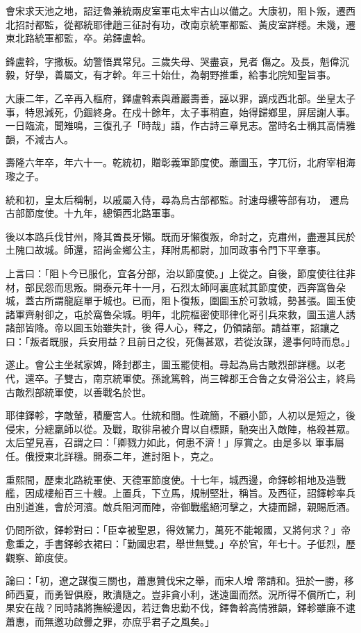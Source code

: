 \begin{pinyinscope}
 會宋求天池之地，詔迂魯兼統兩皮室軍屯太牢古山以備之。大康初，阻卜叛，遷西北招討都監，從都統耶律趙三征討有功，改南京統軍都監、黃皮室詳穩。未幾，遷東北路統軍都監，卒。弟鐸盧斡。



 鋒盧斡，字撒板。幼警悟異常兒。三歲失母、哭盡哀，見者
 傷之。及長，魁偉沉毅，好學，善屬文，有才幹。年三十始仕，為朝野推重，給事北院知聖旨事。



 大康二年，乙辛再入樞府，鐸盧斡素與蕭巖壽善，誣以罪，謫戍西北部。坐皇太子事，特恩減死，仍錮終身。在戍十餘年，太子事稍直，始得歸鄉里，屏居謝人事。一日臨流，聞雉鳴，三復孔子「時哉」語，作古詩三章見志。當時名士稱其高情雅韻，不減古人。



 壽隆六年卒，年六十一。乾統初，贈彰義軍節度使。蕭圖玉，字兀衍，北府宰相海瓈之子。



 統和初，皇太后稱制，以戚屬入侍，尋為烏古部都監。討速母縷等部有功，
 遷烏古部節度使。十九年，總領西北路軍事。



 後以本路兵伐甘州，降其酋長牙懶。既而牙懶復叛，命討之，克肅州，盡遷其民於土隗口故城。師還，詔尚金鄉公主，拜附馬都尉，加同政事令門下平章事。



 上言曰：「阻卜今已服化，宜各分部，治以節度使。」上從之。自後，節度使往往非材，部民怨而思叛。開泰元年十一月，石烈太師阿裏底弒其節度使，西奔窩魯朵城，蓋古所謂龍庭單于城也。已而，阻卜復叛，圍圖玉於可敦城，勢甚張。圖玉使諸軍齊射卻之，屯於窩魯朵城。明年，北院樞密使耶律化哥引兵來救，圖玉遣人誘諸部皆降。帝以圖玉始雖失計，後
 得人心，釋之，仍領諸部。請益軍，詔讓之曰：「叛者既服，兵安用益？且前日之役，死傷甚眾，若從汝謀，邊事何時而息。」



 遂止。會公主坐弒家婢，降封郡主，圖玉罷使相。尋起為烏古敵烈部詳穩。以老代，還卒。子雙古，南京統軍使。孫訛篤斡，尚三韓郡王合魯之女骨浴公主，終烏古敵烈部統軍使，以善戰名於世。



 耶律鐸軫，字敵輦，積慶宮人。仕統和間。性疏簡，不顧小節，人初以是短之，後侵宋，分總羸師以從。及戰，取徘帛被介胄以自標顯，馳突出入敵陣，格殺甚眾。太后望見喜，召謂之曰：「卿戮力如此，何患不濟！」厚賞之。由是多以
 軍事屬任。俄授東北詳穩。開泰二年，進討阻卜，克之。



 重熙間，歷東北路統軍使、天德軍節度使。十七年，城西邊，命鐸軫相地及造戰艦，因成樓船百三十艘。上置兵，下立馬，規制堅壯，稱旨。及西征，詔鐸軫率兵由別道進，會於河濱。敵兵阻河而陣，帝御戰艦絕河擊之，大捷而歸，親賜卮酒。



 仍問所欲，鐸軫對曰：「臣幸被聖恩，得效駑力，萬死不能報國，又將何求？」帝愈重之，手書鐸軫衣裙曰：「勤國忠君，舉世無雙。」卒於官，年七十。子低烈，歷觀察、節度使。



 論曰：「初，遼之謀復三關也，蕭惠贊伐宋之舉，而宋人增
 幣請和。狃於一勝，移師西夏，而勇智俱廢，敗潰隨之。豈非貪小利，迷遠圖而然。況所得不償所亡，利果安在哉？同時諸將撫綏邊因，若迂魯忠勤不伐，鐸魯斡高情雅韻，鐸軫雖廉不逮蕭惠，而無邀功啟釁之罪，亦庶乎君子之風矣。」



\end{pinyinscope}